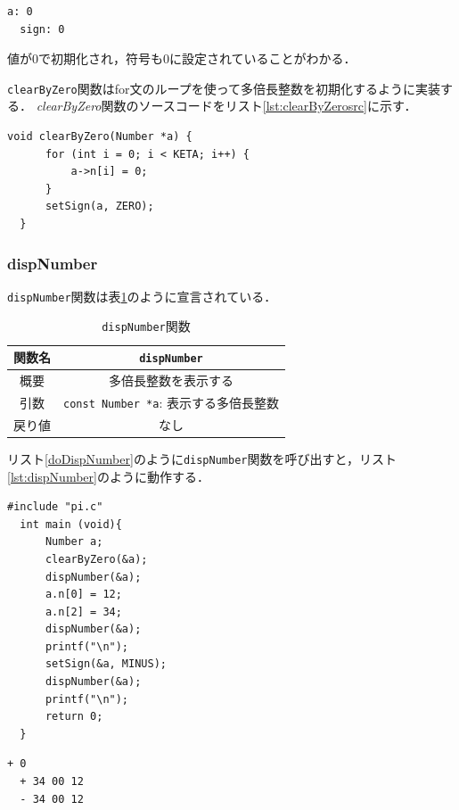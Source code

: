 \documentclass[a4paper,11pt,dvipdfmx]{jsarticle}
\begin{document}
\begin{lstlisting}[caption=リスト\ref{doClearByZero}の実行結果,label=lst:clearByZero]
  a: 0
  sign: 0
\end{lstlisting}

値が0で初期化され，符号も0に設定されていることがわかる．

\texttt{clearByZero}関数はfor文のループを使って多倍長整数を初期化するように実装する．
\textit{clearByZero}関数のソースコードをリスト\ref{lst:clearByZerosrc}に示す．
\begin{lstlisting}[caption=clearByZero関数,label=lst:clearByZerosrc]
  void clearByZero(Number *a) {
      for (int i = 0; i < KETA; i++) {
          a->n[i] = 0;
      }
      setSign(a, ZERO);
  }
\end{lstlisting}

\subsubsection{dispNumber}
\texttt{dispNumber}関数は表\ref{table:lst:dispNumber}のように宣言されている．

\begin{table}[H]
\centering
\caption{\texttt{dispNumber}関数}
\label{table:lst:dispNumber}
\begin{tabular}{c||c}
\hline
関数名    & \texttt{dispNumber}   \\
\hline
概要    & 多倍長整数を表示する   \\
\hline
引数    & \texttt{const Number *a}: 表示する多倍長整数   \\
\hline
戻り値    & なし   \\
\hline
\end{tabular}

\end{table}

リスト\ref{doDispNumber}のように\texttt{dispNumber}関数を呼び出すと，リスト\ref{lst:dispNumber}のように動作する．
\begin{lstlisting}[caption=\texttt{dispNumber}関数の呼び出し,label=doDispNumber]
  #include "pi.c"
  int main (void){
      Number a;
      clearByZero(&a);
      dispNumber(&a);
      a.n[0] = 12;
      a.n[2] = 34;
      dispNumber(&a);
      printf("\n");
      setSign(&a, MINUS);
      dispNumber(&a);
      printf("\n");
      return 0;
  }
\end{lstlisting}

\begin{lstlisting}[caption=リスト\ref{doDispNumber}の実行結果,label=lst:dispNumber]
  + 0
  + 34 00 12
  - 34 00 12
\end{lstlisting}
\end{document}
